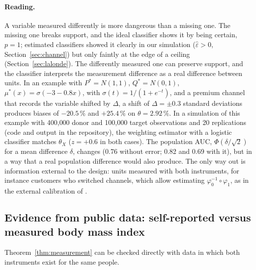 \paragraph{Reading.} A variable measured differently is more dangerous than a missing one. The missing one breaks support, and the ideal classifier shows it by being certain, $p=1$; estimated classifiers showed it clearly in our simulation ($\hat\varepsilon>0$, Section~\ref{sec:channel}) but only faintly at the edge of a ceiling (Section~\ref{sec:lalonde}). The differently measured one can preserve support, and the classifier interprets the measurement difference as a real difference between units. In an example with $P^*=N(1,1)$, $Q^*=N(0,1)$, $\mu^*(x)=\sigma(-3-0.8x)$, with $\sigma(t)=1/(1+e^{-t})$, and a premium channel that records the variable shifted by $\Delta$, a shift of $\Delta=\pm0.3$ standard deviations produces biases of $-20.5\,\%$ and $+25.4\,\%$ on $\theta=2.92\,\%$. In a simulation of this example with 400{,}000 donor and 100{,}000 target observations and 20 replications (code and output in the repository), the weighting estimator with a logistic classifier matches $\theta_X$ ($z=+0.6$ in both cases). The population AUC, $\Phi(\delta/\sqrt2)$ for a mean difference $\delta$, changes (0.76 without error; 0.82 and 0.69 with it), but in a way that a real population difference would also produce. The only way out is information external to the design: units measured with both instruments, for instance customers who switched channels, which allow estimating $\varphi_0^{-1}\circ\varphi_1$, as in the external calibration of \citet{webbvargas2017}.

\subsection{Evidence from public data: self-reported versus measured body mass index}\label{sec:nhanes}

Theorem~\ref{thm:measurement} can be checked directly with data in which both instruments exist for the same people.

